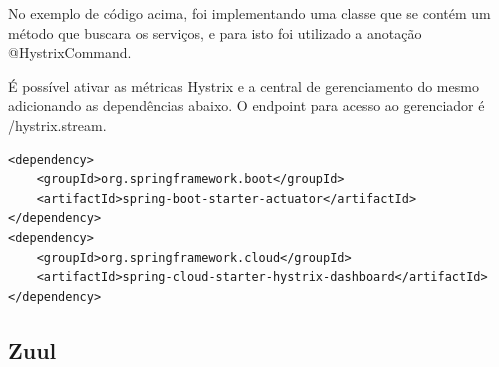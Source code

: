 No exemplo de código acima, foi implementando uma classe que se contém um método que buscara os serviços, e para isto foi utilizado a anotação @HystrixCommand.

É possível ativar as métricas Hystrix e a central de gerenciamento do mesmo adicionando as dependências abaixo. O endpoint para acesso ao gerenciador é /hystrix.stream.

\begin{verbatim}
<dependency>
    <groupId>org.springframework.boot</groupId>
    <artifactId>spring-boot-starter-actuator</artifactId>
</dependency>
<dependency>
    <groupId>org.springframework.cloud</groupId>
    <artifactId>spring-cloud-starter-hystrix-dashboard</artifactId>
</dependency>
\end{verbatim}

\subsection{Zuul}